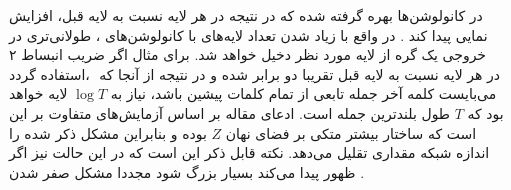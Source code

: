در کانولوشن‌ها بهره گرفته شده که در نتیجه
در هر لایه نسبت به لایه قبل، افزایش نمایی پیدا کند \cite{vae_dialated}. در واقع با زیاد شدن تعداد لایه‌های با کانولوشن‌های \dilated{}، 
 طولانی‌تری در خروجی یک گره از لایه مورد نظر دخیل خواهد شد. برای مثال اگر ضریب انبساط ۲ استفاده گردد، \receiptivefield{}‎ در هر لایه نسبت به لایه قبل تقریبا دو برابر شده و در نتیجه از آنجا که می‌بایست کلمه آخر جمله تابعی از تمام کلمات پیشین باشد،‌ نیاز به $‎\log T$ لایه خواهد بود که $T$ طول بلندترین جمله است. ادعای مقاله بر اساس آزمایش‌های متفاوت بر این است که ساختار \cnn{} بیشتر متکی بر فضای نهان  $Z$ بوده و بنابراین مشکل ذکر شده را مقداری تقلیل می‌دهد. نکته قابل ذکر این است که در این حالت نیز اگر ‎اندازه شبکه بسیار بزرگ شود مجددا مشکل صفر شدن ‎‎ ظهور پیدا می‌کند \cite{vae_dialated}.

